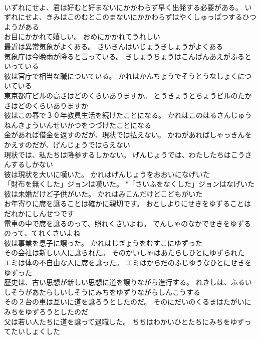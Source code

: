 \documentclass[8pt]{extreport}
\begin{document}
\begin{CJK}{UTF8}{min}
\\	いずれにせよ、君は好むと好まないにかかわらず早く出発する必要がある。	いずれにせよ、きみはこのむとこのまないにかかわらずはやくしゅっぱつするひつようがある 
\\	お目にかかれて嬉しい。	おめにかかれてうれしい 
\\	最近は異常気象がよくある。	さいきんはいじょうきしょうがよくある 
\\	気象庁は今晩雨が降ると言っている。	きしょうちょうはこんばんあえがふるといっている 
\\	彼は官庁で相当な職についている。	かれはかんちょうでそうとうなしょくについている 
\\	東京都庁ビルの高さはどのくらいありますか。	とうきょうとちょうビルのたかさはどのくらいありますか 
\\	彼はこの春で３０年教員生活を続けたことになる。	かれはこのはるさんじゅうねんきょういんせいかつをつづけたことになる 
\\	金があれば借金を返すのだが、現状では払えない。	かねがあればしゃっきんをかえすのだが、げんじょうではらえない 
\\	現状では、私たちは降参するしかない。	げんじょうでは、わたしたちはこうさんするしかない 
\\	彼は現状を大いに嘆いた。	かれはげんじょうをおおいになげいた 
\\	「財布を無くした」ジョンは嘆いた。	"「さいふをなくした」ジョンはなげいた 
\\	彼は未婚だけど子供がいた。	かれはみこんだけどこどもがいた 
\\	お年寄りに席を譲ることは確かに親切です。	おとしよりにせきをゆずることはだれかにしんせつです 
\\	電車の中で席を譲るのって、照れくさいよね。	でんしゃのなかでせきをゆずるのって、てれくさいよね 
\\	彼は事業を息子に譲った。	かれはじぎょうをむすこにゆずった 
\\	その会社は新しい人に譲られた。	そのかいしゃはあたらしひとにゆずられた 
\\	エミは体の不自由な人に席を譲った。	エミはからだのふじゆうなひとにせきをゆずった 
\\	歴史は、古い思想が新しい思想に道を譲りながら進行する。	れきしは、ふるいしそうがあたらしいしそうにみちをゆずりながらしんこうする 
\\	その２台の車は互いに道を譲ろうとしたのだ。	そのにだいのくるまはたがいにみちをゆずろうとしたのだ 
\\	父は若い人たちに道を譲って退職した。	ちちはわかいひとたちにみちをゆずってたいしょくした 

\end{CJK}
\end{document}
